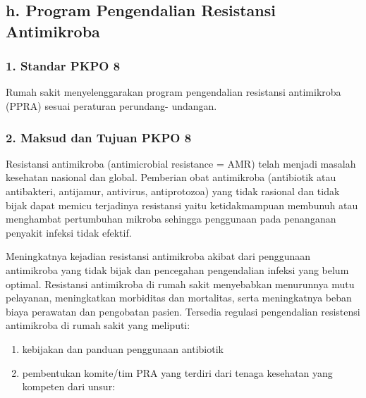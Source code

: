 \documentclass[
]{book}
\providecommand{\tightlist}{%
  \setlength{\itemsep}{0pt}\setlength{\parskip}{0pt}}
\begin{document}
\hypertarget{h.-program-pengendalian-resistansi-antimikroba}{%
\subsection*{h. Program Pengendalian Resistansi Antimikroba}\label{h.-program-pengendalian-resistansi-antimikroba}}

\hypertarget{standar-pkpo-8}{%
\subsubsection*{1. Standar PKPO 8}\label{standar-pkpo-8}}

Rumah sakit menyelenggarakan program pengendalian resistansi antimikroba (PPRA) sesuai peraturan perundang- undangan.

\hypertarget{maksud-dan-tujuan-pkpo-8}{%
\subsubsection*{2. Maksud dan Tujuan PKPO 8}\label{maksud-dan-tujuan-pkpo-8}}

Resistansi antimikroba (antimicrobial resistance = AMR) telah menjadi masalah kesehatan nasional dan global. Pemberian obat antimikroba (antibiotik atau antibakteri, antijamur, antivirus, antiprotozoa) yang tidak rasional dan tidak bijak dapat memicu terjadinya resistansi yaitu ketidakmampuan membunuh atau menghambat pertumbuhan mikroba sehingga penggunaan pada penanganan penyakit infeksi tidak efektif.

Meningkatnya kejadian resistansi antimikroba akibat dari penggunaan antimikroba yang tidak bijak dan pencegahan pengendalian infeksi yang belum optimal. Resistansi antimikroba di rumah sakit menyebabkan menurunnya mutu pelayanan, meningkatkan morbiditas dan mortalitas, serta meningkatnya beban biaya perawatan dan pengobatan pasien.
Tersedia regulasi pengendalian resistensi antimikroba di rumah sakit yang meliputi:

\begin{enumerate}
\def\labelenumi{\alph{enumi}.}
\tightlist
\item
  kebijakan dan panduan penggunaan antibiotik
\item
  pembentukan komite/tim PRA yang terdiri dari tenaga kesehatan yang kompeten dari unsur:
\end{enumerate}
\end{document}
